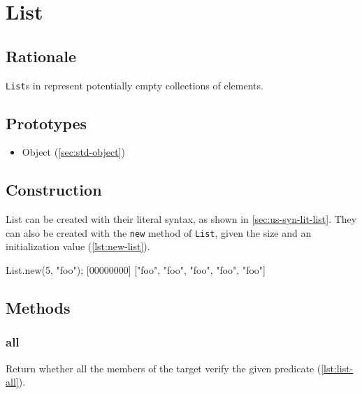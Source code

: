\section{List}
\subsection{Rationale}

\lstinline|List|s in \us represent potentially empty collections of
elements.

\subsection{Prototypes}

\begin{itemize}
\item Object (\autoref{sec:std-object})
\end{itemize}

\subsection{Construction}

List can be created with their literal syntax, as shown in
\autoref{sec:us-syn-lit-list}. They can also be created with the
\lstinline|new| method of \lstinline|List|, given the size and an
initialization value (\autoref{lst:new-list}).

\begin{urbiscript}[caption=List.new, label=lst:new-list,
  float=\floatposh]
List.new(5, "foo");
[00000000] ["foo", "foo", "foo", "foo", "foo"]
\end{urbiscript}

\subsection{Methods}

\subsubsection{all}

Return whether all the members of the target verify the given
predicate (\autoref{lst:list-all}).


